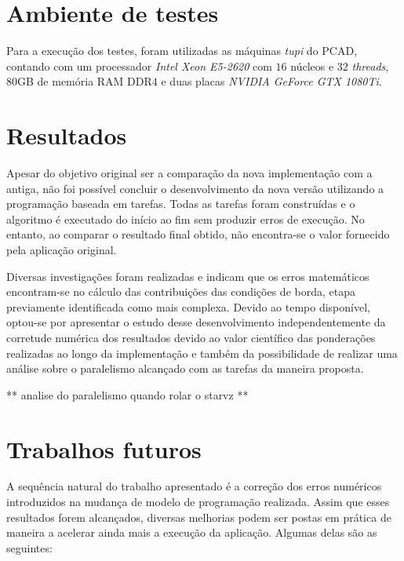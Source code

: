 \documentclass[cic,tc]{iiufrgs}
\begin{document}
\section{Ambiente de testes}

Para a execução dos testes, foram utilizadas as máquinas \textit{tupi} do PCAD, contando com um processador \textit{Intel Xeon E5-2620} com $16$
núcleos e $32$ \textit{threads}, $80$GB de memória RAM DDR$4$ e duas placas \textit{NVIDIA GeForce GTX 1080Ti}.
\section{Resultados}

Apesar do objetivo original ser a comparação da nova implementação com a antiga, não foi possível concluir o desenvolvimento da nova versão utilizando
a programação baseada em tarefas. Todas as tarefas foram construídas e o algoritmo é executado do início ao fim sem produzir erros de execução. No entanto,
ao comparar o resultado final obtido, não encontra-se o valor fornecido pela aplicação original.

Diversas investigações foram realizadas e indicam que os erros matemáticos encontram-se no cálculo das contribuições das condições de borda, etapa previamente
identificada como mais complexa. Devido ao tempo disponível, optou-se por apresentar o estudo desse desenvolvimento independentemente da corretude numérica dos resultados
devido ao valor científico das ponderações realizadas ao longo da implementação e também da possibilidade de realizar uma análise sobre o paralelismo alcançado
com as tarefas da maneira proposta.

** analise do paralelismo quando rolar o starvz **

\section{Trabalhos futuros}

A sequência natural do trabalho apresentado é a correção dos erros numéricos introduzidos na mudança de modelo de programação realizada. Assim que esses resultados
forem alcançados, diversas melhorias podem ser postas em prática de maneira a acelerar ainda mais a execução da aplicação. Algumas delas são as seguintes:
\end{document}
